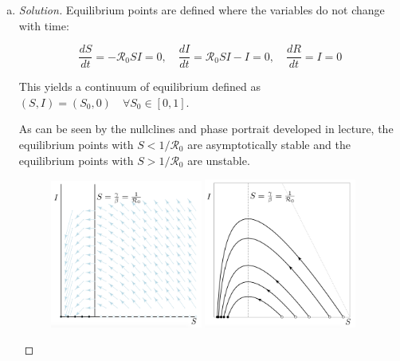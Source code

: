 \documentclass[12pt]{article}
\begin{document}
\begin{enumerate}[(a)]
{\begin{proof}[Answers]
For any point, $P \in \Delta \setminus \mathcal{O}, P=\{(S,I)|S \geq \frac{1}{\mathcal{R}_0}, I > 0, S+I \leq 1\}$. We can see from ~\eqref{E:SIR} that $\frac{dS}{dt} < 0$ for all $P$. This means that $S$ will decrease and continue to decrease until $P \in \mathcal{O}$, as $I$ will increase while $P \in \Delta \setminus \mathcal{O}$ preventing $P$ from approaching an equilibrium before $P \in \mathcal{O}$. By the asymptotic stability of $\mathcal{C}$ within $\mathcal{O}$, $P$ will proceed to $I=0$.
\end{proof}
This makes biological sense as any endemic will end eventually, at which point there will be no infectious individuals, so $I=0$, and $I=0$ is the only point at which an epidemic will end, as patients will eventually move to the removed class. 
}


\item \basicSIRanalQd

{\color{blue}
\begin{proof}[Solution]
	Equilibrium points are defined where the variables do not change with time:
	
	\begin{equation}
	\frac{dS}{dt}=-\mathcal{R}_0 SI=0, \quad \frac{dI}{dt}=\mathcal{R}_0 SI-I=0, \quad \frac{dR}{dt}=I=0
	\end{equation}
	
	This yields a continuum of equilibrium defined as $(S,I)=(S_0,0) \quad \forall S_0 \in [0,1]$.
	
	As can be seen by the nullclines and phase portrait developed in lecture, the equilibrium points with $S<1/\mathcal{R}_0$ are asymptotically stable and the equilibrium points with  $S>1/\mathcal{R}_0$ are unstable.

\begin{figure}[h]
\begin{center}
		\includegraphics[width=5cm]{images/4MB3_A1_2d_nc.png}
		\includegraphics[width=5cm]{images/4MB3_A1_2d_pp.png}
\end{center}
\end{figure}
	

\end{proof}}
\end{enumerate}
\end{document}
